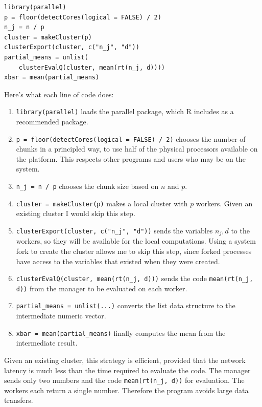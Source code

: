 \documentclass[12pt]{article}
\begin{document}
\begin{verbatim}
library(parallel)
p = floor(detectCores(logical = FALSE) / 2)
n_j = n / p
cluster = makeCluster(p)
clusterExport(cluster, c("n_j", "d"))
partial_means = unlist(
    clusterEvalQ(cluster, mean(rt(n_j, d))))
xbar = mean(partial_means)
\end{verbatim}

Here's what each line of code does:

\begin{enumerate}
    \item \texttt{library(parallel)} loads the parallel package, which R
        includes as a recommended package.
    \item \texttt{p = floor(detectCores(logical = FALSE) / 2)}
        chooses the number of chunks in a principled way, to use half of
        the physical processors available on the platform. This respects
        other programs and users who may be on the system.
    \item \texttt{n\_j = n / p} chooses the chunk size based on $n$ and
        $p$. 
    \item \texttt{cluster = makeCluster(p)} makes a local cluster with $p$
        workers. Given an existing cluster I would skip this step.
    \item \texttt{clusterExport(cluster, c("n\_j", "d"))} sends the
        variables $n_j, d$ to the workers, so they will be available for
        the local computations.
        Using a system fork to create the cluster allows me to
        skip this step, since forked processes have access to the variables
        that existed when they were created.
    \item \texttt{clusterEvalQ(cluster, mean(rt(n\_j, d)))} sends the code
        \texttt{mean(rt(n\_j, d))} from the manager to be evaluated on each
        worker.
    \item \texttt{partial\_means = unlist(...)} converts the list data
        structure to the intermediate numeric vector.
    \item \texttt{xbar = mean(partial\_means)} finally computes the mean
        from the intermediate result.
\end{enumerate}

Given an existing cluster, this strategy is efficient, provided that the
network latency is much less than the time required to evaluate the code.
The manager sends only two numbers and the code \texttt{mean(rt(n\_j, d))}
for evaluation. The workers each return a single number. Therefore the
program avoids large data transfers.
\end{document}
